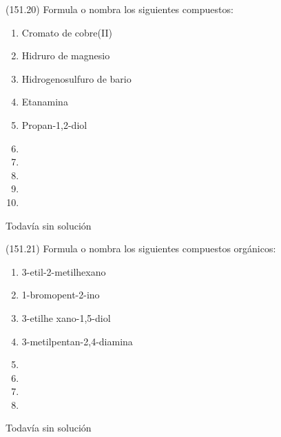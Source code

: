 \documentclass[10pt,a5paper,twoside]{article}
\begin{document}
  \begin{exercise}[
      tags    = {},
      topics  = {química, química orgánica, orgánica},
      source  = {FQ 1B MGH 2016, p151, e20},
    ]
    (151.20) Formula o nombra los siguientes compuestos:
    \begin{enumerate}
      \item Cromato de cobre(II)
      \item Hidruro de magnesio
      \item Hidrogenosulfuro de bario
      \item Etanamina
      \item Propan-1,2-diol
      \item {}
      \item {}
      \item {}
      \item {}
      \item {}
    \end{enumerate}
  \end{exercise}

  \begin{solution}[print=false]
    Todavía sin solución
  \end{solution}




  \begin{exercise}[
      tags    = {},
      topics  = {química, química orgánica, orgánica},
      source  = {FQ 1B MGH 2016, p151, e21},
    ]
    (151.21) Formula o nombra los siguientes compuestos orgánicos:
    \begin{enumerate}
      \item 3-etil-2-metilhexano
      \item 1-bromopent-2-ino
      \item 3-etilhe xano-1,5-diol
      \item 3-metilpentan-2,4-diamina
      \item {}
      \item {}
      \item {}
      \item {}
    \end{enumerate}
  \end{exercise}

  \begin{solution}[print=false]
    Todavía sin solución
  \end{solution}
\end{document}
